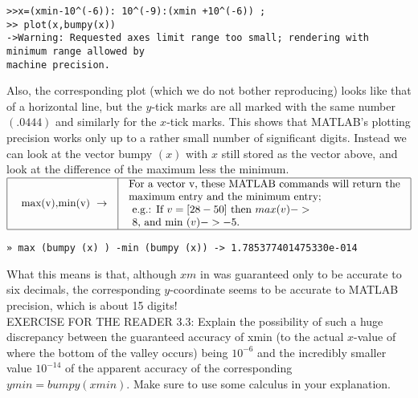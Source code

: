 \documentclass[../main.tex]{subfiles}
\begin{document}
\begin{verbatim}
>>x=(xmin-10^(-6)): 10^(-9):(xmin +10^(-6)) ;
>> plot(x,bumpy(x))
->Warning: Requested axes limit range too small; rendering with minimum range allowed by
machine precision.
\end{verbatim}

Also, the corresponding plot (which we do not bother reproducing) looks like that of a horizontal line, but the $y$-tick marks are all marked with the same number $(.0444)$ and similarly for the $x$-tick marks. This shows that MATLAB's plotting precision works only up to a rather small number of significant digits. Instead we can look at the vector bumpy $(x)$ with $x$ still stored as the vector above, and look at the difference of the maximum less the minimum.
\\
$
\begin{array}{|l|l|}
\hline \begin{array}{l}
\text { max(v),min(v) } \rightarrow \\
\end{array} & \begin{array}{l}
\text {For a vector v, these MATLAB commands will return the}\\
\text {maximum entry and the minimum entry; }\\
\text{ e.g.: If $v=[2  8  -50]$ then $max(v) ->$}\\
\text{ $8$, and min $(v) -> -5$.}
\end{array} \\
\hline
\end{array}
$\\

\begin{verbatim}
» max (bumpy (x) ) -min (bumpy (x)) -> 1.785377401475330e-014
\end{verbatim}

What this means is that, although $xm$ in was guaranteed only to be accurate to six decimals, the corresponding $y$-coordinate seems to be accurate to MATLAB precision, which is about 15 digits!\\

EXERCISE FOR THE READER 3.3: Explain the possibility of such a huge discrepancy between the guaranteed accuracy of xmin (to the actual $x$-value of where the bottom of the valley occurs) being $10^{-6}$ and the incredibly smaller value $10^{-14}$ of the apparent accuracy of the corresponding $ymin = bumpy(xmin)$. Make sure to use some calculus in your explanation.\\
\end{document}
